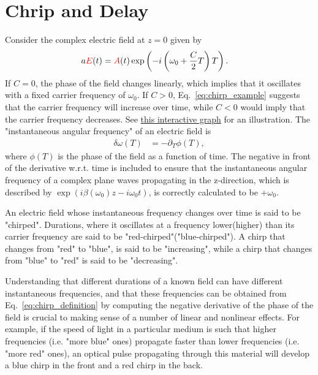 \section{Chrip and Delay}
Consider the complex electric field at $z=0$ given by
\begin{align}
\label{eq:chirp_example}
    a\textcolor{red}{E}(t) &= \textcolor{red}{A}(t)\exp\left(  -i\left(\omega_0 +\frac{C}{2}T \right)T   \right).
\end{align}
If $C=0$, the phase of the field changes linearly, which implies that it oscillates with a fixed carrier frequency of $\omega_0$. If $C>0$, Eq.~\ref{eq:chirp_example} suggests that the carrier frequency will increase over time, while $C<0$ would imply that the carrier frequency decreases. See \href{https://www.desmos.com/calculator/gd7s8nhfdn}{this interactive graph} for an illustration. The "instantaneous angular frequency" of an electric field is
\begin{align}
\label{eq:chirp_definition}
    \delta\omega(T) &= -\partial_T\phi(T),
\end{align}
where $\phi(T)$ is the phase of the field as a function of time. The negative in front of the derivative w.r.t. time is included to ensure that the instantaneous angular frequency of a complex plane waves propagating in the z-direction, which is described by $\exp(i\beta(\omega_0)z-i\omega_0 t)$, is correctly calculated to be $+\omega_0$.

An electric field whose instantaneous frequency changes over time is said to be "chirped". Durations, where it oscillates at a frequency lower(higher) than its carrier frequency are said to be "red-chirped"("blue-chirped"). A chirp that changes from "red" to "blue", is said to be "increasing", while a chirp that changes from "blue" to "red" is said to be "decreasing". 

Understanding that different durations of a known field can have different instantaneous frequencies, and that these frequencies can be obtained from Eq.~\ref{eq:chirp_definition} by computing the negative derivative of the phase of the field is crucial to making sense of a number of linear and nonlinear effects. For example, if the speed of light in a particular medium is such that higher frequencies (i.e. "more blue" ones) propagate faster than lower frequencies (i.e. "more red" ones), an optical pulse propagating through this material will develop a blue chirp in the front and a red chirp in the back. 

